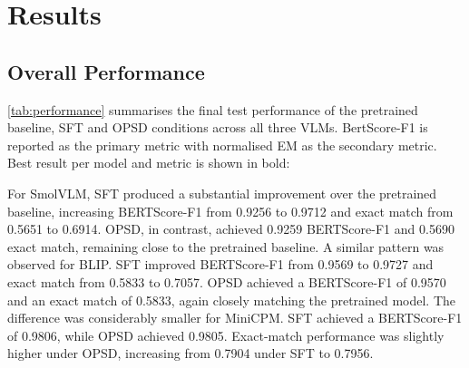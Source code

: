 \section{Results}\label{results}

\subsection{Overall Performance}\label{overall_performance}

\autoref{tab:performance} summarises the final test performance of the pretrained baseline, SFT and
OPSD conditions across all three VLMs. BertScore-F1 is reported as the primary metric with
normalised EM as the secondary metric. Best result per model and metric is shown in bold:

\begin{table}[h!]
\centering
\caption{Final test performance across pretrained, SFT, and OPSD conditions.}
\label{tab:performance}
\end{table}

For SmolVLM, SFT produced a substantial improvement over the pretrained baseline, increasing
BERTScore-F1 from 0.9256 to 0.9712 and exact match from 0.5651 to 0.6914. OPSD, in contrast,
achieved 0.9259 BERTScore-F1 and 0.5690 exact match, remaining close to the pretrained baseline.
A similar pattern was observed for BLIP. SFT improved BERTScore-F1 from 0.9569 to 0.9727 
and exact match from 0.5833 to 0.7057. OPSD achieved a BERTScore-F1 of 0.9570 and an 
exact match of 0.5833, again closely matching the pretrained model. The difference was 
considerably smaller for MiniCPM. SFT achieved a BERTScore-F1 of 0.9806, while 
OPSD achieved 0.9805. Exact-match performance was slightly higher under OPSD, 
increasing from 0.7904 under SFT to 0.7956.

